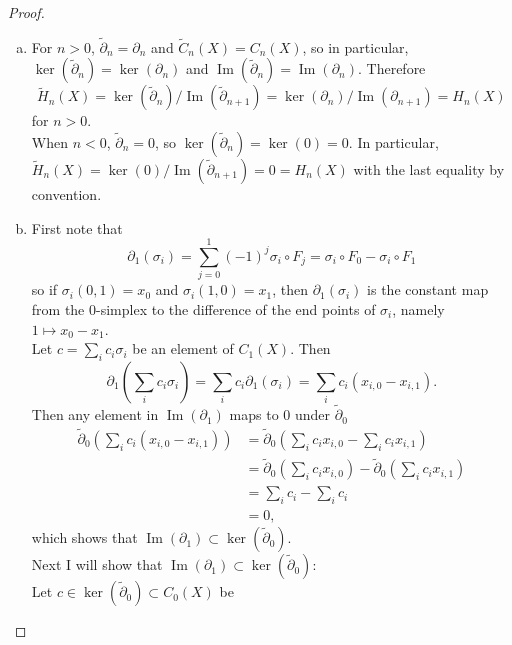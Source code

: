 \documentclass{article}
\DeclareMathOperator{\im}{Im}
\begin{document}
\begin{proof} \text{} \\
  \begin{enumerate}[a.]
    \item For $n > 0$, $\widetilde\partial_n = \partial_n$ and
    $\widetilde C_n(X) = C_n(X)$, so in particular,
    $\ker(\widetilde\partial_n) = \ker(\partial_n)$ and
    $\im(\widetilde\partial_n) = \im(\partial_n)$. Therefore \[
      \widetilde H_n(X)
      = \ker(\widetilde\partial_n)/\im(\widetilde\partial_{n+1})
      = \ker(\partial_n)/\im(\partial_{n+1})
      = H_n(X)
    \] for $n > 0$.
    \\
    When $n < 0$, $\widetilde\partial_n = 0$, so
    $\ker(\widetilde\partial_n) = \ker(0) = 0$. In particular,
    $\widetilde H_n(X) = \ker(0)/\im(\widetilde\partial_{n+1}) = 0 = H_n(X)$
    with the last equality by convention.
    \item %
    First note that \[
      \partial_1(\sigma_i) = \sum_{j=0}^1 (-1)^j \sigma_i \circ F_j = \sigma_i \circ F_0 - \sigma_i \circ F_1
    \] so if $\sigma_i(0, 1) = x_0$ and $\sigma_i(1, 0) = x_1$, then
    $\partial_1(\sigma_i)$ is the constant map from the $0$-simplex to the
    difference of the end points of $\sigma_i$, namely $1 \mapsto x_0 - x_1$.
    \\
    Let $c = \sum_{i} c_i \sigma_i$ be an element of $C_1(X)$. Then \[
      \partial_1\!\!\left(\sum_{i} c_i \sigma_i\right)
      = \sum_{i} c_i \partial_1(\sigma_i)
      = \sum_{i} c_i (x_{i,0} - x_{i,1}).
    \]
    Then any element in $\im(\partial_1)$ maps to $0$ under
    $\widetilde\partial_0$ \begin{align*}
      \widetilde\partial_0\!\!\left(\sum_{i} c_i (x_{i,0} - x_{i,1})\right)
      &= \widetilde\partial_0\!\!\left(\sum_{i} c_i x_{i,0} - \sum_{i}c_i x_{i,1}\right) \\
      &= \widetilde\partial_0\!\!\left(\sum_{i} c_i x_{i,0}\right) - \widetilde\partial_0\!\!\left(\sum_{i}c_i x_{i,1}\right) \\
      &= \sum_{i} c_i - \sum_{i} c_i \\
      &= 0,
    \end{align*}
    which shows that $\im(\partial_1) \subset \ker(\widetilde \partial_0)$.
    \\
    Next I will show that $\im(\partial_1) \subset \ker(\widetilde \partial_0)$:
    \\
    Let $c \in \ker(\widetilde\partial_0) \subset C_0(X)$ be

\end{enumerate}
\end{proof}
\end{document}
